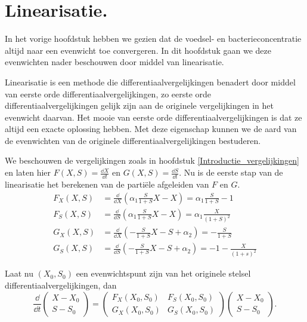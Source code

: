 
\chapter{Linearisatie.}
\label{Linearisatie}

In het vorige hoofdstuk hebben we gezien dat de voedsel- en bacterieconcentratie altijd naar een evenwicht toe convergeren. In dit hoofdstuk gaan we deze evenwichten nader beschouwen door middel van linearisatie.

Linearisatie is een methode die differentiaalvergelijkingen benadert door middel van eerste orde differentiaalvergelijkingen, zo eerste orde differentiaalvergelijkingen gelijk zijn aan de originele vergelijkingen in het evenwicht daarvan. Het mooie van eerste orde differentiaalvergelijkingen is dat ze altijd een exacte oplossing hebben. Met deze eigenschap kunnen we de aard van de evenwichten van de originele differentiaalvergelijkingen bestuderen.

We beschouwen de vergelijkingen zoals in hoofdstuk \ref{Introductie_vergelijkingen} en laten hier $F(X,S) = \frac{\dd X}{\dd t}$ en $G(X,S) = \frac{\dd S}{\dd t}$. Nu is de eerste stap van de linearisatie het berekenen van de parti\"ele afgeleiden van $F$ en $G$.
\begin{align*}
F_X(X,S) &= \frac{\dd}{\dd X} \left(\alpha_1 \frac{S}{1 + S} X - X \right) = \alpha_1\frac{S}{1 + S} - 1\\
F_S(X,S) &= \frac{\dd}{\dd S} \left(\alpha_1 \frac{S}{1 + S} X - X \right) = \alpha_1\frac{X}{(1+S)^2}\\
G_X(X,S) &= \frac{\dd}{\dd X} \left(-\frac{S}{1 + S}X - S + \alpha_2 \right) = -\frac{S}{1 + S}\\
G_S(X,S) &= \frac{\dd}{\dd S} \left(-\frac{S}{1 + S}X - S + \alpha_2 \right) = -1-\frac{X}{(1+s)^2}
\end{align*}

Laat nu $(X_0, S_0)$ een evenwichtspunt zijn van het originele stelsel differentiaalvergelijkingen, dan
\[\frac{\dd}{\dd t}\left( \begin{array}{c}
X-X_0 \\
S-S_0 \end{array} \right)
= \left( \begin{array}{cc}
F_X(X_0,S_0) & F_S(X_0,S_0) \\
G_X(X_0,S_0) & G_S(X_0,S_0) \end{array} \right)
\left( \begin{array}{c}
X-X_0 \\
S-S_0 \end{array} \right).\]


